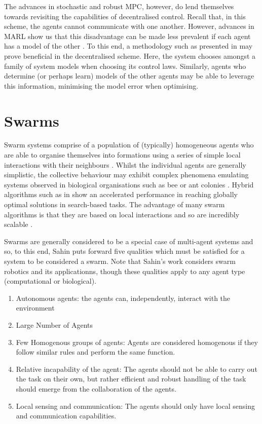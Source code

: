 \documentclass[.../main.tex]{subfiles}
\begin{document}
The advances in stochastic and robust MPC, however, do lend themselves towards revisiting the
capabilities of decentralised control. Recall that, in this scheme, the agents cannot communicate
with one another. However, advances in MARL show us that this disadvantage can be made less
prevalent if each agent has a model of the other \cite{Foerster}. To this end, a methodology such as
presented in \cite{Heirung2019} may prove beneficial in the decentralised scheme. Here, the system
chooses amongst a family of system models when choosing its control laws. Similarly, agents who
determine (or perhaps learn) models of the other agents may be able to leverage this information,
minimising the model error when optimising.


\section{Swarms} \label{sec::Swarms}

Swarm systems comprise of a population of (typically) homogeneous
agents who are able to organise themselves into formations using a
series of simple local interactions with their neighbours
\cite{Couceiro2015}. Whilst the individual agents are generally
simplistic, the collective behaviour may exhibit complex phenomena
emulating systems observed in biological organisations such as bee or
ant colonies \cite{Sethi2017}. Hybrid algorithms such as in
\cite{Gao2018} show an accelerated performance in reaching globally
optimal solutions in search-based tasks. The advantage of many swarm
algorithms is that they are based on local interactions and so are
incredibly scalable \cite{Rizk2018}. 

Swarms are generally considered to be a special case of multi-agent systems and so, to this end,
Sahin \cite{Sahin2005} puts forward five qualities which must be satisfied for a system to be
considered a swarm. Note that Sahin's work considers swarm robotics and its applicationns, though
these qualities apply to any agent type (computational or biological).

\begin{enumerate}
    \item Autonomous agents: the agents can, independently, interact with the environment
    \item Large Number of Agents
    \item Few Homogenous groups of agents: Agents are considered homogenous if they follow similar
    rules and perform the same function.
    \item Relative incapability of the agent: The agents should not be able to carry out the task on
    their own, but rather efficient and robust handling of the task should emerge from the
    collaboration of the agents.
    \item Local sensing and communication: The agents should only have local sensing and
    communication capabilities.
\end{enumerate}
\end{document}
